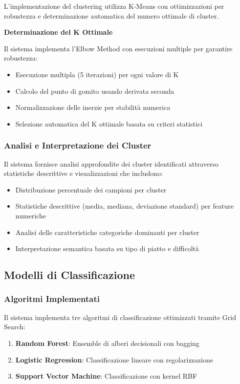 \documentclass[12pt,a4paper]{article}
\begin{document}
L'implementazione del clustering utilizza K-Means con ottimizzazioni per robustezza e determinazione automatica del numero ottimale di cluster.

\textbf{Determinazione del K Ottimale}

Il sistema implementa l'Elbow Method con esecuzioni multiple per garantire robustezza:
\begin{itemize}
    \item Esecuzione multipla (5 iterazioni) per ogni valore di K
    \item Calcolo del punto di gomito usando derivata seconda
    \item Normalizzazione delle inerzie per stabilità numerica
    \item Selezione automatica del K ottimale basata su criteri statistici
\end{itemize}

\subsubsection{Analisi e Interpretazione dei Cluster}

Il sistema fornisce analisi approfondite dei cluster identificati attraverso statistiche descrittive e visualizzazioni che includono:
\begin{itemize}
    \item Distribuzione percentuale dei campioni per cluster
    \item Statistiche descrittive (media, mediana, deviazione standard) per feature numeriche
    \item Analisi delle caratteristiche categoriche dominanti per cluster
    \item Interpretazione semantica basata su tipo di piatto e difficoltà
\end{itemize}

\subsection{Modelli di Classificazione}

\subsubsection{Algoritmi Implementati}

Il sistema implementa tre algoritmi di classificazione ottimizzati tramite Grid Search:

\begin{enumerate}
    \item \textbf{Random Forest}: Ensemble di alberi decisionali con bagging
    \item \textbf{Logistic Regression}: Classificazione lineare con regolarizzazione
    \item \textbf{Support Vector Machine}: Classificazione con kernel RBF
\end{enumerate}
\end{document}

